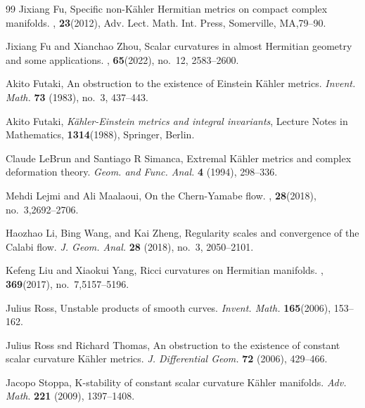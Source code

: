 \documentclass[12pt]{amsart}
\theoremstyle{plain}
\theoremstyle{definition}
\renewcommand{\>}{\rightarrow}
\renewcommand{\#}{\sharp}
\numberwithin{equation}{section} %
\begin{document}
\begin{thebibliography}{99}
    Jixiang Fu,
    \newblock Specific non-K\"{a}hler Hermitian metrics on compact complex
    manifolds.
    ,
    \textbf{23}(2012), Adv. Lect. Math. Int. Press, Somerville, MA,79--90.


    Jixiang Fu and Xianchao Zhou,
    \newblock Scalar curvatures in almost {H}ermitian geometry and some
    applications.
    ,
    \textbf{65}(2022), no.~12, 2583--2600.

    Akito Futaki,
    An obstruction to the existence of Einstein K\"ahler metrics.
    {\it Invent. Math.}
    {\bf 73} (1983), no.~3, 437--443.


    Akito Futaki,
    {\it K\"ahler-Einstein metrics and integral invariants},
    Lecture Notes in Mathematics,
    {\bf 1314}(1988), Springer, Berlin.




    Claude LeBrun and Santiago R Simanca,
    Extremal {K}\"ahler metrics and complex deformation theory.
    {\it Geom. and Func. Anal.}
    \textbf{4} (1994),  298--336.


    Mehdi Lejmi and Ali Maalaoui,
    \newblock On the Chern-Yamabe flow.
    ,
    {\bf 28}(2018), no.~3,2692--2706.



    Haozhao Li, Bing Wang, and Kai Zheng,
    Regularity scales and convergence of the Calabi flow.
    {\it J. Geom. Anal.}
    {\bf 28} (2018), no.~3, 2050--2101.


    Kefeng Liu and Xiaokui Yang,
    \newblock Ricci curvatures on Hermitian manifolds.
    ,
    {\bf 369}(2017), no.~7,5157--5196.


    Julius Ross,
    Unstable products of smooth curves.
    {\it Invent. Math.} {\bf 165}(2006), 153--162.

    Julius Ross snd Richard Thomas,
    An obstruction to the existence of constant scalar curvature K\"ahler metrics.
    {\it J. Differential Geom.}
    \textbf{72} (2006), 429--466.


    Jacopo Stoppa,
    K-stability of constant scalar curvature K\"ahler
  manifolds.
    {\it Adv. Math}. \textbf{221} (2009),  1397--1408.


\end{thebibliography}
\end{document}
